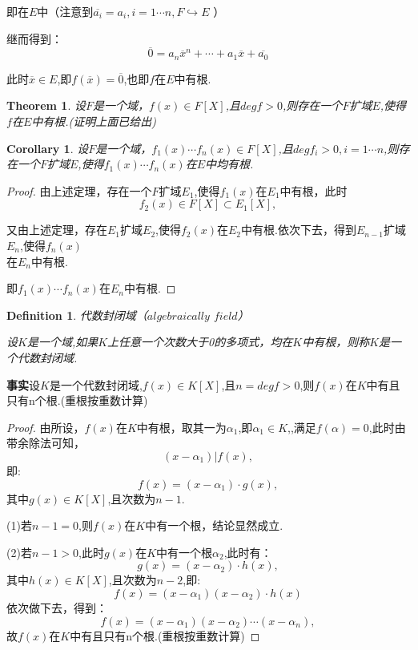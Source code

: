 \documentclass[UTF8]{article}
\newtheorem{thm}{Theorem}[section]
\newtheorem{defn}{Definition}[section]
\newtheorem{cor}{Corollary}[section]
\begin{document}
即在$E$中（注意到$\overline{a_i}=a_i,i=1\cdots n,F\hookrightarrow E$ ）

继而得到：$$\overline{0}=a_n\overline{x}^n+\cdots+a_1\overline{x}+\overline{a_0}$$

此时$\overline{x}\in E$,即$f(\overline{x})=\overline{0}$,也即$f$在$E$中有根.

\begin{thm}设$F$是一个域，$f(x)\in F[X]$,且$degf>0$,则存在一个$F$扩域$E$,使得$f$在$E$中有根.(证明上面已给出)
\end{thm}
\begin{cor} 设$F$是一个域，$f_1(x)\cdots f_n(x)\in F[X]$,且$degf_i>0,i=1\cdots n$,则存在一个$F$扩域$E$,使得$f_1(x)\cdots f_n(x)$在$E$中均有根.
	\end{cor}
\begin{proof}
由上述定理，存在一个$F$扩域$E_1$,使得$f_1(x)$在$E_1$中有根，此时$$f_2(x)\in F[X]\subset E_1[X],$$

又由上述定理，存在$E_1$扩域$E_2$,使得$f_2(x)$在$E_2$中有根.依次下去，得到$E_{n-1}$扩域$E_n$,使得$f_n(x)$\\在$E_n$中有根.

即$f_1(x)\cdots f_n(x)$在$E_n$中有根.
\end{proof}

\begin{defn}代数封闭域（$algebraically$  $field$）

设$K$是一个域,如果$K$上任意一个次数大于0的多项式，均在$K$中有根，则称$K$是一个代数封闭域.
\end{defn}
\textbf{事实}\quad 设$K$是一个代数封闭域,$f(x)\in K[X]$,且$n=degf>0$,则$f(x)$在$K$中有且只有n个根.(重根按重数计算)
\begin{proof}
由所设，$f(x)$在$K$中有根，取其一为$\alpha_1$,即$\alpha_1\in K$,,满足$f(\alpha)=0$,此时由带余除法可知，$$(x-\alpha_1)|f(x),$$ 即:$$f(x)=(x-\alpha_1)\cdot g(x),$$其中$g(x)\in K[X]$,且次数为$n-1$.

(1)若$n-1=0$,则$f(x)$在$K$中有一个根，结论显然成立.

(2)若$n-1>0$,此时$g(x)$在$K$中有一个根$\alpha_2$,此时有：$$g(x)=(x-\alpha_2)\cdot h(x),$$其中$h(x)\in K[X]$,且次数为$n-2$,即:$$f(x)=(x-\alpha_1)(x-\alpha_2)\cdot h(x)$$依次做下去，得到：$$f(x)=(x-\alpha_1)(x-\alpha_2) \cdots (x-\alpha_n),$$故$f(x)$在$K$中有且只有n个根.(重根按重数计算)
\end{proof}
\end{document}
